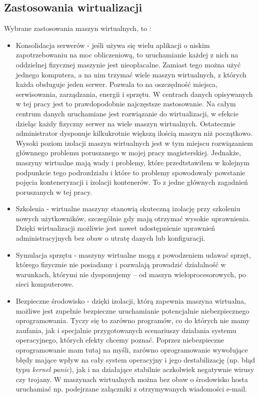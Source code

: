 \documentclass[10pt,a4paper,titlepage,twoside]{report}
\begin{document}
\subsection{Zastosowania wirtualizacji}\indent \indent Wybrane zastosowania maszyn wirtualnych, to \cite{ad15}:
\begin{itemize}
	\item Konsolidacja serwerów - jeśli używa się wielu aplikacji o niskim zapotrzebowaniu na moc obliczeniową, to uruchamianie każdej z nich na oddzielnej fizycznej maszynie jest nieopłacalne. Zamiast tego można użyć jednego komputera, a na nim trzymać wiele maszyn wirtualnych, z których każda obsługuje jeden serwer. Pozwala to na oszczędność miejsca, serwisowania, zarządzania, energii i sprzętu. W centrach danych opisywanych w tej pracy jest to prawdopodobnie najczęstsze zastosowanie. Na całym centrum danych uruchamiane jest rozwiązanie do wirtualizacji, w efekcie dzieląc każdy fizyczny serwer na wiele maszyn wirtualnych. Ostatecznie administrator dysponuje kilkukrotnie większą ilością maszyn niż początkowo. Wysoki poziom izolacji maszyn wirtualnych jest w tym miejscu rozwiązaniem głównnego problemu poruszanego w mojej pracy magisterskiej. Jednakże, maszyny wirtualne mają wady i problemy, które przedtstawiłem w kolejnym podpunkcie tego podrozdziału i które to problemy spowodowały powstanie pojęcia konteneryzacji i izolacji kontenerów. To z jedne głównych zagadnień poruszanych w tej pracy.
	\item Szkolenia - wirtualne maszyny stanowią skuteczną izolację przy szkoleniu nowych użytkowników, szczególnie gdy mają otrzymać wysokie uprawnienia. Dzięki wirtualizacji możliwie jest nawet udostępnienie uprawnień administracyjnych bez obaw o utratę danych lub konfiguracji.
	\item Symulacja sprzętu - maszyny wirtualne mogą z powodzeniem udawać sprzęt, którego fizycznie nie posiadamy i pozwalają prowadzić działalność w warunkach, którymi nie dysponujemy – od maszyn wieloprocesorowych, po sieci komputerowe.
	\item Bezpieczne środowisko - dzięki izolacji, którą zapewnia maszyna wirtualna, możliwe jest zupełnie bezpieczne uruchamianie potencjalnie niebezpiecznego oprogramowania. Tyczy się to zarówno programów, co do których nie mamy zaufania, jak i specjalnie przygotowanych scenariuszy działania systemu operacyjnego, których efekty chcemy poznać. Poprzez niebezpieczne oprogramowanie mam tutaj na myśli, zarówno oprogramowanie wywołujące błędy mające wpływ na cały system operacyjny i jego destabilizację (np. błąd typu \textit{kernel panic}), jak i na działające stabilnie aczkolwiek negatywnie wirusy czy trojany. W maszynach wirtualnych można bez obaw o środowisko hosta uruchamiać np. podejrzane załączniki z otrzymywanych wiadomości e-mail.

\end{itemize}
\end{document}
